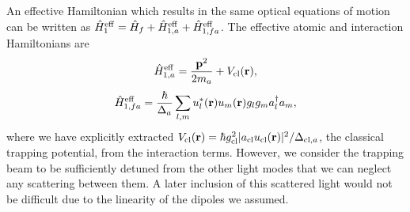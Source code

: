 An effective Hamiltonian which results in the same optical equations
of motion can be written as
$\hat{H}^\mathrm{eff}_1 = \hat{H}_f + \hat{H}^\mathrm{eff}_{1,a} +
\hat{H}^\mathrm{eff}_{1,fa}$. The effective atomic and interaction
Hamiltonians are
\begin{equation}
\label{eq:aeff}
  \hat{H}^\mathrm{eff}_{1,a} = \frac{\mathbf{p}^2}{2 m_a} + V_\mathrm{cl}(\mathbf{r}),
\end{equation}
\begin{equation}
\label{eq:faeff}
  \hat{H}^\mathrm{eff}_{1,fa} = \frac{\hbar}{\Delta_a} \sum_{l,m}
  u_l^*(\mathbf{r}) u_m(\mathbf{r}) g_l g_m a^\dagger_l a_m,
\end{equation}
where we have explicitly extracted
$V_\mathrm{cl}(\mathbf{r}) = \hbar g_\mathrm{cl}^2 |a_\mathrm{cl}
u_\mathrm{cl}(\mathbf{r})|^2 / \Delta_{\mathrm{cl},a}$, the classical
trapping potential, from the interaction terms. However, we consider
the trapping beam to be sufficiently detuned from the other light
modes that we can neglect any scattering between them. A later
inclusion of this scattered light would not be difficult due to the
linearity of the dipoles we assumed.

